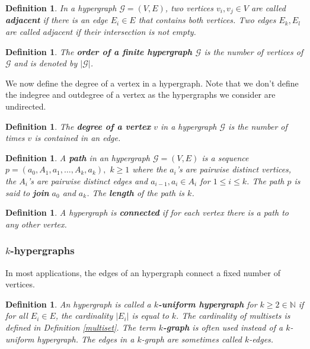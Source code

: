 \documentclass[a4paper,11pt]{report}
\newtheorem{definition}[theorem]{Definition}
\newcommand{\N}{{\mathbb N}}
\newcommand{\hgraf}{\mathcal{G}}
\begin{document}
\begin{definition}
  In a hypergraph $\hgraf=(V,E)$, two vertices $v_i, v_j \in V$ are called 
  \textbf{adjacent} if there is an edge $E_i \in E$ that contains both vertices. 
  Two edges $E_k, E_l$ are called adjacent if their intersection is not empty.
\end{definition}

\begin{definition}
  The \textbf{order of a finite hypergraph $\hgraf$} is the number of vertices of $\hgraf$ 
  and is denoted by $|\hgraf|$.
\end{definition}
We now define the degree of a vertex in a hypergraph. Note that we don't define 
the indegree and outdegree of  a vertex as the hypergraphs we consider are 
undirected.
\begin{definition}
The \textbf{degree of a vertex} $v$ in a hypergraph $\hgraf$ is the number of 
times $v$ is contained in an edge.
\end{definition}

\begin{definition}
A \textbf{path} in an hypergraph $\hgraf = (V,E)$ is a sequence $p = (a_0, A_1, a_1, \ldots, A_k, a_k),$ $k \geq 1$ where the
$a_i$'s are pairwise distinct vertices, the $A_i$'s are pairwise distinct
edges and ${a_{i-1}, a_i} \in A_i$ for $1 \leq i \leq k$. The path $p$ is said 
to \textbf{join} $a_0$ and $a_k$. The \textbf{length} of the path is $k$.
\end{definition}

\begin{definition}
A hypergraph is \textbf{connected} if for each vertex there is a path to any 
other vertex.

\end{definition}
\subsubsection{$k$-hypergraphs}
In most applications, the edges of an hypergraph connect a fixed number of 
vertices. 
\begin{definition}
  An hypergraph is called a \textbf{$k$-uniform hypergraph} for $k \geq 2 \in \N$ if for all $E_i \in E$, 
  the cardinality $|E_i|$ is equal to $k$. The cardinality of multisets is defined in Definition \ref{multiset}.
  The term \textbf{$k$-graph} is often used 
  instead of a $k$-uniform hypergraph. The edges in a $k$-graph are sometimes 
  called $k$-edges.
\end{definition}
\end{document}
